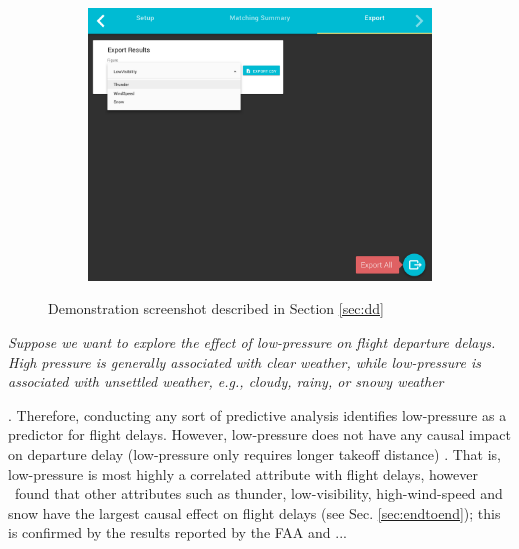 \begin{figure}[t]
\begin{subfigure}{0.33\linewidth}
  \end{subfigure}\hfill
  \begin{subfigure}{0.33\linewidth}
    \centering
    \hspace{-.6cm}
    \includegraphics[scale=0.13]{Figures/Export.png}
    \caption{\scriptsize }
    \label{sfig:testcc}
  \end{subfigure}\hfill
\caption{Demonstration screenshot described in Section \ref{sec:dd}}
\label{fig:inteface}
\vspace{-0.3cm}
\end{figure}

\begin{example} \em \delay   \label{ex:press} \em
  Suppose we want to explore the effect of low-pressure on flight departure delays.
  High pressure is generally associated with clear weather,
    while low-pressure is associated with unsettled weather, e.g.,
    cloudy, rainy, or snowy weather.
  Therefore, conducting any sort of predictive analysis identifies
    low-pressure as a predictor for flight delays.
  However, low-pressure does not have any causal impact on departure delay
    (low-pressure only requires longer takeoff distance) \cite{FAA08}.
  That is, low-pressure is most highly a correlated attribute with flight delays,
    however \GSQL\ found that other attributes such as thunder, low-visibility, high-wind-speed and
    snow have the largest causal effect on flight delays (see Sec. \ref{sec:endtoend});
  this is confirmed by the results reported by the FAA and ...
\end{example}

